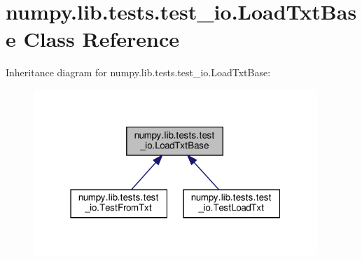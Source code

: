 \hypertarget{classnumpy_1_1lib_1_1tests_1_1test__io_1_1LoadTxtBase}{}\section{numpy.\+lib.\+tests.\+test\+\_\+io.\+Load\+Txt\+Base Class Reference}
\label{classnumpy_1_1lib_1_1tests_1_1test__io_1_1LoadTxtBase}


Inheritance diagram for numpy.\+lib.\+tests.\+test\+\_\+io.\+Load\+Txt\+Base\+:
\nopagebreak
\begin{figure}[H]
\begin{center}
\leavevmode
\includegraphics[width=304pt]{classnumpy_1_1lib_1_1tests_1_1test__io_1_1LoadTxtBase__inherit__graph}
\end{center}
\end{figure}
